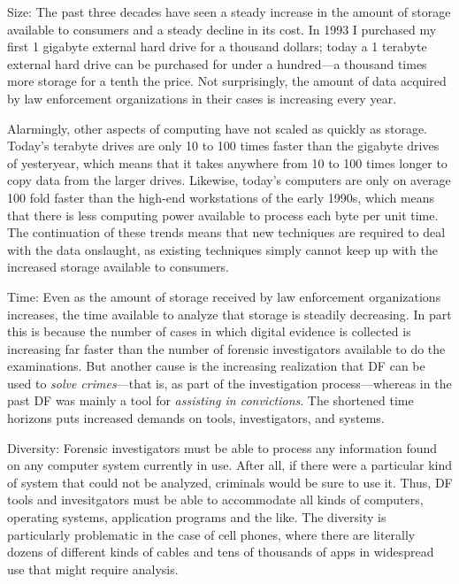 \begin{compactdesc}

\item[Size:] The past three decades have seen a steady increase in the
  amount of storage available to consumers and a steady decline in its
  cost. In 1993 I purchased my first 1 gigabyte external hard drive
  for a thousand dollars; today a 1 terabyte external hard drive can
  be purchased for under a hundred---a thousand times more
  storage for a tenth the price. Not surprisingly, the amount of data
  acquired by law enforcement organizations in their cases is
  increasing every year.

  Alarmingly, other aspects of computing have not scaled as quickly as
  storage. Today's terabyte drives are only 10 to 100 times faster
  than the gigabyte drives of yesteryear, which means that it takes anywhere
  from 10 to 100 times longer to copy  data from the larger
  drives. Likewise, today's computers are only on average 100 fold
  faster than the high-end workstations of the early 1990s, which
  means that there is less computing power available to process each
  byte per unit time. The continuation of these trends means that new techniques are
  required to deal with the data onslaught, as existing techniques
  simply cannot keep up with the increased storage available to consumers.


\item[Time:] Even as the amount of storage received by law enforcement
  organizations increases, the time available to analyze that storage
  is steadily decreasing. In part this is because the number of cases
  in which digital evidence is collected is increasing far faster than
  the number of forensic investigators available to do the
  examinations. But another cause is the increasing realization that
  DF can be used to \emph{solve crimes}---that is, as
  part of the investigation process---whereas in the
  past DF was mainly a tool for \emph{assisting in convictions}. The
  shortened time horizons puts increased demands on tools,
  investigators, and systems.

\item[Diversity:] Forensic investigators must be able to process any
  information found on any computer system currently in use. After
  all, if there were a particular kind of system that could not be
  analyzed, criminals would be sure to use it. Thus, DF tools and
  invesitgators must be able to accommodate all kinds of computers,
  operating systems, application programs and the like. The diversity
  is particularly problematic in the case of cell phones, where there
  are literally dozens of different kinds of cables and tens of
  thousands of apps in widespread use that might require analysis.


\end{compactdesc}
